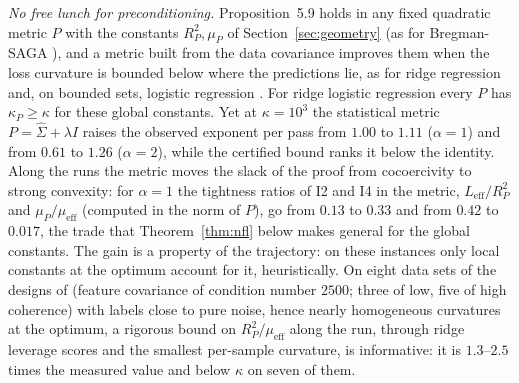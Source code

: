 \documentclass[10pt]{article}
\theoremstyle{remark}
\newcommand{\muEff}{\mu_{\mathrm{eff}}}
\newcommand{\LEff}{L_{\mathrm{eff}}}
\begin{document}
\begin{description}[leftmargin=2.3em,labelwidth=2.0em,labelsep=0.3em,itemsep=1pt,topsep=3pt,parsep=0pt,font=\normalfont\bfseries]
\item[(C5)] \emph{No free lunch for preconditioning.} Proposition~5.9 holds in any fixed quadratic metric $P$ with the
constants $R_P^2,\mu_P$ of Section~\ref{sec:geometry} (as for Bregman-SAGA \cite{dragomir2021fast}), and a metric built
from the data covariance improves them when the loss curvature is bounded below where the predictions lie, as for ridge
regression \cite{yang2014data,gonen2016solving} and, on bounded sets, logistic regression \cite{yang2014data}. For ridge
logistic regression every $P$ has $\kappa_P\ge\kappa$ for these global constants. Yet at $\kappa=10^3$ the statistical
metric $P=\hat\Sigma+\lambda I$ raises the observed exponent per pass from $1.00$ to $1.11$ ($\alpha=1$) and from
$0.61$ to $1.26$ ($\alpha=2$), while the certified bound ranks it below the identity. Along the runs the metric moves
the slack of the proof from cocoercivity to strong convexity: for $\alpha=1$ the tightness ratios of I2 and I4 in the
metric, $\LEff/R_P^2$ and $\mu_P/\muEff$ (computed in the norm of $P$), go from $0.13$ to $0.33$ and from $0.42$ to
$0.017$, the trade that Theorem~\ref{thm:nfl} below makes general for the global constants. The gain is a property of
the trajectory: on these instances only local constants at the optimum account for it, heuristically. On eight data
sets of the designs of \cite{na2023hessian} (feature covariance of condition number $2500$; three of low, five of high
coherence) with labels close to pure noise, hence nearly homogeneous curvatures at the optimum, a rigorous bound on
$R_P^2/\muEff$ along the run, through ridge leverage scores and the smallest per-sample curvature, is informative: it
is $1.3$--$2.5$ times the measured value and below $\kappa$ on seven of them.
\end{description}
\end{document}
